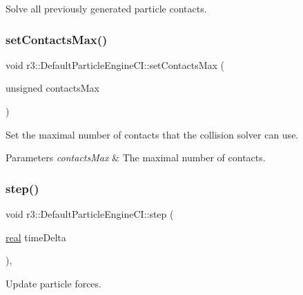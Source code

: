 Solve all previously generated particle contacts. 

\mbox{\label{classr3_1_1_default_particle_engine_c_i_a7dbb49cbf2f5b028656ea2e14174a3ed}} 
\subsubsection{\texorpdfstring{set\+Contacts\+Max()}{setContactsMax()}}
{\footnotesize\ttfamily void r3\+::\+Default\+Particle\+Engine\+C\+I\+::set\+Contacts\+Max (\begin{DoxyParamCaption}\item[{unsigned}]{contacts\+Max }\end{DoxyParamCaption})}



Set the maximal number of contacts that the collision solver can use. 


\begin{DoxyParams}{Parameters}
{\em contacts\+Max} & The maximal number of contacts. \\
\hline
\end{DoxyParams}
\mbox{\label{classr3_1_1_default_particle_engine_c_i_a7c58fd00ec521410e1b412e9885ee0d2}} 
\subsubsection{\texorpdfstring{step()}{step()}}
{\footnotesize\ttfamily void r3\+::\+Default\+Particle\+Engine\+C\+I\+::step (\begin{DoxyParamCaption}\item[{\mbox{\hyperlink{namespacer3_ab2016b3e3f743fb735afce242f0dc1eb}{real}}}]{time\+Delta }\end{DoxyParamCaption})\hspace{0.3cm}{\ttfamily [override]}, {\ttfamily [virtual]}}



Update particle forces. 



